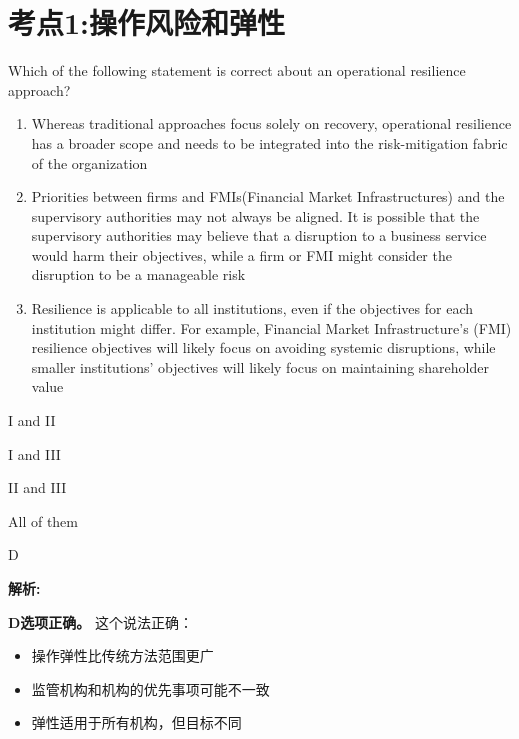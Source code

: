 \documentclass{article}
\newcounter{question} %
\newenvironment{explanation}
{\textbf{解析:}\par}
{\par}
\begin{document}
 \tableofcontents %
\newpage




\section{考点1:操作风险和弹性}
\setcounter{question}{0}

\begin{question}
    Which of the following statement is correct about an operational resilience approach?
    \begin{enumerate}
        \item Whereas traditional approaches focus solely on recovery, operational resilience has a broader scope and needs to be integrated into the risk-mitigation fabric of the organization
        \item Priorities between firms and FMIs(Financial Market Infrastructures) and the supervisory authorities may not always be aligned. It is possible that the supervisory authorities may believe that a disruption to a business service would harm their objectives, while a firm or FMI might consider the disruption to be a manageable risk
        \item Resilience is applicable to all institutions, even if the objectives for each institution might differ. For example, Financial Market Infrastructure's (FMI) resilience objectives will likely focus on avoiding systemic disruptions, while smaller institutions' objectives will likely focus on maintaining shareholder value
    \end{enumerate}
\end{question}

\begin{choices}
    \item I and II
    \item I and III
    \item II and III
    \item All of them
\end{choices}

\begin{correctanswer}
    D
\end{correctanswer}

\begin{explanation}
   

    \textbf{D选项正确。}
    这个说法正确：
        \begin{itemize}
            \item 操作弹性比传统方法范围更广
            \item 监管机构和机构的优先事项可能不一致
            \item 弹性适用于所有机构，但目标不同
        \end{itemize}
\end{explanation}
\end{document}
